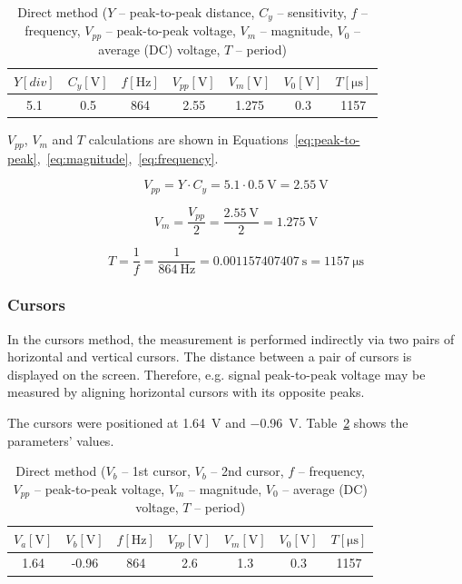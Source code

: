 \begin{table}[H]
	\centering
	\begin{tabular}{c|c|c|c|c|c|c}
		$Y [div]$ & $C_{y} [\unit{\volt}]$ & $f [\unit{\hertz}]$ & $V_{pp} [\unit{\volt}]$ & $V_{m} [\unit{\volt}]$ & $V_{0} [\unit{\volt}]$ & $T [\unit{\micro\second}]$\\
		\hline
		5.1 & 0.5 & 864 & 2.55 & 1.275 & 0.3 & 1157
	\end{tabular}
	\caption{Direct method ($Y$ -- peak-to-peak distance, $C_{y}$ -- sensitivity, $f$ -- frequency, $V_{pp}$ -- peak-to-peak voltage, $V_{m}$ -- magnitude, $V_{0}$ -- average (DC) voltage, $T$ -- period)}
	\label{tab:direct-method}
\end{table}

$V_{pp}$, $V_{m}$ and $T$ calculations are shown in Equations~\ref{eq:peak-to-peak},~\ref{eq:magnitude},~\ref{eq:frequency}.


\begin{equation}
	V_{pp} = Y\cdot C_{y} = 5.1\cdot \SI{0.5}{\volt} = \SI{2.55}{\volt}
	\label{eq:peak-to-peak}
\end{equation}

\begin{equation}
	V_{m} = \frac{V_{pp}}{2} = \frac{\SI{2.55}{\volt}}{2} = \SI{1.275}{\volt}
	\label{eq:magnitude}
\end{equation}

\begin{equation}
	T = \frac{1}{f} = \frac{1}{\SI{864}{\hertz}} = \SI{0.001157407407}{\second} = \SI{1157}{\micro\second}
	\label{eq:frequency}
\end{equation}

\subsubsection*{Cursors}

In the cursors method, the measurement is performed indirectly via two pairs of horizontal and vertical cursors. The distance between a pair of cursors is displayed on the screen. Therefore, e.g. signal peak-to-peak voltage may be measured by aligning horizontal cursors with its opposite peaks.

The cursors were positioned at \SI{1.64}{\volt} and \SI{-0.96}{\volt}. Table~\ref{tab:cursors-method} shows the parameters' values.

\begin{table}[H]
	\centering
	\begin{tabular}{c|c|c|c|c|c|c}
		$V_{a} [\unit\volt]$ & $V_{b} [\unit\volt]$ & $f [\unit{\hertz}]$ & $V_{pp} [\unit{\volt}]$ & $V_{m} [\unit{\volt}]$ & $V_{0} [\unit{\volt}]$ & $T [\unit{\micro\second}]$\\
		\hline
		1.64 & -0.96 & 864 & 2.6 & 1.3 & 0.3 & 1157
	\end{tabular}
	\caption{Direct method ($V_{b}$ -- 1st cursor, $V_{b}$ -- 2nd cursor, $f$ -- frequency, $V_{pp}$ -- peak-to-peak voltage, $V_{m}$ -- magnitude, $V_{0}$ -- average (DC) voltage, $T$ -- period)}
	\label{tab:cursors-method}
\end{table}


